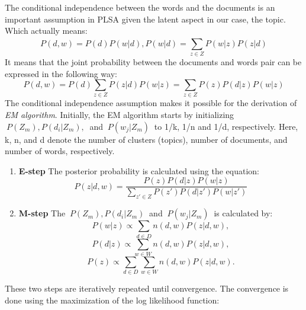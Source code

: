 \documentclass[12pt]{report}
\begin{document}
        The conditional independence between the words and the documents is an important assumption in PLSA given the latent aspect
        in our case, the topic. Which actually means:
        \begin{equation}P(d, w) = P(d) P(w|d), P(w|d) = \sum_{z \in Z}^{} P(w|z) P(z|d) \end{equation}
        It means that the joint probability between the documents and words pair can be expressed in the following way:
        \begin{equation}\label{eq4}
            P(d, w) = P(d) \sum_{z \in Z} P(z|d) P(w|z) = \sum_{z \in Z} P(z) P(d|z) P(w|z)
        \end{equation}
        The conditional independence assumption makes it possible for the derivation of \emph{EM algorithm}.
        Initially, the EM algorithm starts by initializing $~{P(Z_m), P(d_i|Z_m),}~$ and $~{P(w_j|Z_m)}~$ to 1/k, 1/n and 1/d, respectively.
        Here, k, n, and d denote the number of clusters (topics), number of documents, and number of words, respectively.
        \begin{enumerate}
            \item \textbf{E-step} The posterior probability is calculated using the equation:
                    \begin{equation}
                        P(z|d, w) = \frac{P(z) P(d|z) P(w|z)}{\sum_{z' \in Z} P(z') P(d|z') P(w|z')}
                    \end{equation}
            \item \textbf{M-step} The $~{P(Z_m), P(d_i|Z_m)}~$ and $~{P(w_j|Z_m)}~$ is calculated by:
                    \begin{equation}
                        P(w|z) \propto \sum_{d \in D} n(d, w) P(z|d, w),
                    \end{equation}
                    \begin{equation}
                        P(d|z) \propto \sum_{w \in W} n(d, w) P(z|d, w),
                    \end{equation}
                    \begin{equation}
                        P(z) \propto \sum_{d \in D} \sum_{w \in W} n(d, w) P(z|d, w).
                    \end{equation}
        \end{enumerate}
        These two steps are iteratively repeated until convergence. The convergence is done using the maximization of the log likelihood
        function:
\end{document}
